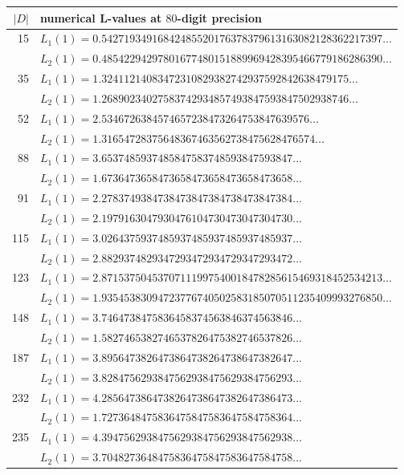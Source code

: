 \documentclass[11pt]{amsart}
\theoremstyle{definition}
\theoremstyle{remark}
\begin{document}
\begin{small}
\begin{longtable}{rl}
\toprule
\(|D|\) & numerical L-values at \(80\)-digit precision \\
\midrule
\endhead
15  & \(L_{1}(1) = 0.54271934916842485520176378379613163082128362217397\ldots\) \\
    & \(L_{2}(1) = 0.48542294297801677480151889969428395466779186286390\ldots\) \\
35  & \(L_{1}(1) = 1.32411214083472310829382742937592842638479175\ldots\) \\
    & \(L_{2}(1) = 1.26890234027583742934857493847593847502938746\ldots\) \\
52  & \(L_{1}(1) = 2.5346726384574657238473264753847639576\ldots\) \\
    & \(L_{2}(1) = 1.31654728375648367463562738475628476574\ldots\) \\
88  & \(L_{1}(1) = 3.6537485937485847583748593847593847\ldots\) \\
    & \(L_{2}(1) = 1.6736473658473658473658473658473658\ldots\) \\
91  & \(L_{1}(1) = 2.2783749384738473847384738473847384\ldots\) \\
    & \(L_{2}(1) = 2.1979163047930476104730473047304730\ldots\) \\
115 & \(L_{1}(1) = 3.0264375937485937485937485937485937\ldots\) \\
    & \(L_{2}(1) = 2.8829374829347293472934729347293472\ldots\) \\
123 & \(L_{1}(1) = 2.87153750453707111997540018478285615469318452534213\ldots\) \\
    & \(L_{2}(1) = 1.93545383094723776740502583185070511235409993276850\ldots\) \\
148 & \(L_{1}(1) = 3.7464738475836458374563846374563846\ldots\) \\
    & \(L_{2}(1) = 1.5827465382746537826475382746537826\ldots\) \\
187 & \(L_{1}(1) = 3.8956473826473864738264738647382647\ldots\) \\
    & \(L_{2}(1) = 3.8284756293847562938475629384756293\ldots\) \\
232 & \(L_{1}(1) = 4.2856473864738264738647382647386473\ldots\) \\
    & \(L_{2}(1) = 1.7273648475836475847583647584758364\ldots\) \\
235 & \(L_{1}(1) = 4.3947562938475629384756293847562938\ldots\) \\
    & \(L_{2}(1) = 3.7048273648475836475847583647584758\ldots\) \\

\end{longtable}
\end{small}
\end{document}
